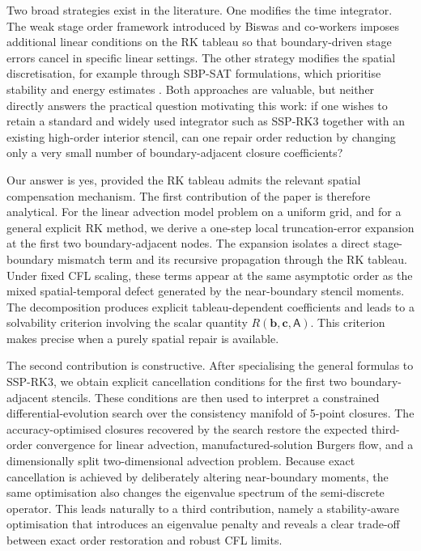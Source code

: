 \documentclass[review,hidelinks,onefignum,onetabnum]{siamart251216}
\begin{document}
Two broad strategies exist in the literature. One modifies the time integrator. The weak stage order framework introduced by Biswas and co-workers \cite{Biswas2023,Biswas2024} imposes additional linear conditions on the RK tableau so that boundary-driven stage errors cancel in specific linear settings. The other strategy modifies the spatial discretisation, for example through SBP-SAT formulations, which prioritise stability and energy estimates \cite{Mattsson2004,Mattsson2014}. Both approaches are valuable, but neither directly answers the practical question motivating this work: if one wishes to retain a standard and widely used integrator such as SSP-RK3 together with an existing high-order interior stencil, can one repair order reduction by changing only a very small number of boundary-adjacent closure coefficients?

Our answer is yes, provided the RK tableau admits the relevant spatial compensation mechanism. The first contribution of the paper is therefore analytical. For the linear advection model problem on a uniform grid, and for a general explicit RK method, we derive a one-step local truncation-error expansion at the first two boundary-adjacent nodes. The expansion isolates a direct stage-boundary mismatch term and its recursive propagation through the RK tableau. Under fixed CFL scaling, these terms appear at the same asymptotic order as the mixed spatial-temporal defect generated by the near-boundary stencil moments. The decomposition produces explicit tableau-dependent coefficients and leads to a solvability criterion involving the scalar quantity $R(\mathbf b,\mathbf c,\mathsf A)$. This criterion makes precise when a purely spatial repair is available.

The second contribution is constructive. After specialising the general formulas to SSP-RK3, we obtain explicit cancellation conditions for the first two boundary-adjacent stencils. These conditions are then used to interpret a constrained differential-evolution search over the consistency manifold of 5-point closures. The accuracy-optimised closures recovered by the search restore the expected third-order convergence for linear advection, manufactured-solution Burgers flow, and a dimensionally split two-dimensional advection problem. Because exact cancellation is achieved by deliberately altering near-boundary moments, the same optimisation also changes the eigenvalue spectrum of the semi-discrete operator. This leads naturally to a third contribution, namely a stability-aware optimisation that introduces an eigenvalue penalty and reveals a clear trade-off between exact order restoration and robust CFL limits.
\end{document}
